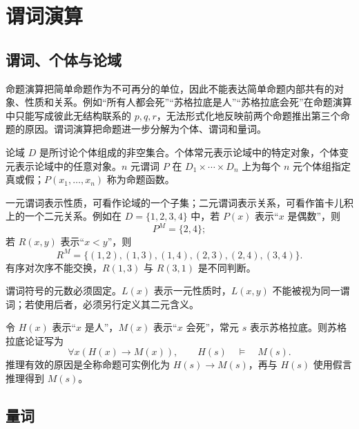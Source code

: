 %
%

\chapter{谓词演算}

\section{谓词、个体与论域}

命题演算把简单命题作为不可再分的单位，因此不能表达简单命题内部共有的对象、性质和关系。例如“所有人都会死”“苏格拉底是人”“苏格拉底会死”在命题演算中只能写成彼此无结构联系的 $p,q,r$，无法形式化地反映前两个命题推出第三个命题的原因。谓词演算把命题进一步分解为个体、谓词和量词。

\begin{definition}[个体、谓词与论域]\label{ch2-predicate}
论域 $D$ 是所讨论个体组成的非空集合。个体常元表示论域中的特定对象，个体变元表示论域中的任意对象。$n$ 元谓词 $P$ 在 $D_1\times\cdots\times D_n$ 上为每个 $n$ 元个体组指定真或假；$P(x_1,\ldots,x_n)$ 称为命题函数。
\end{definition}

一元谓词表示性质，可看作论域的一个子集；二元谓词表示关系，可看作笛卡儿积上的一个二元关系。例如在 $D=\{1,2,3,4\}$ 中，若 $P(x)$ 表示“$x$ 是偶数”，则
\[
P^M=\{2,4\};
\]
若 $R(x,y)$ 表示“$x<y$”，则
\[
R^M=\{(1,2),(1,3),(1,4),(2,3),(2,4),(3,4)\}.
\]
有序对次序不能交换，$R(1,3)$ 与 $R(3,1)$ 是不同判断。

谓词符号的元数必须固定。$L(x)$ 表示一元性质时，$L(x,y)$ 不能被视为同一谓词；若使用后者，必须另行定义其二元含义。

\begin{example}[title={谓词演算保留内部结构}]\label{ch2-socrates}
令 $H(x)$ 表示“$x$ 是人”，$M(x)$ 表示“$x$ 会死”，常元 $s$ 表示苏格拉底。则苏格拉底论证写为
\[
\forall x(H(x)\to M(x)),\qquad H(s)\quad\vDash\quad M(s).
\]
推理有效的原因是全称命题可实例化为 $H(s)\to M(s)$，再与 $H(s)$ 使用假言推理得到 $M(s)$。
\end{example}

\section{量词}

